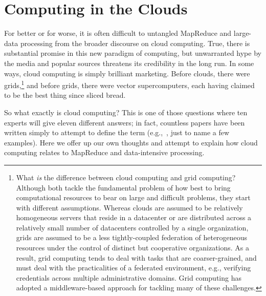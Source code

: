 \section{Computing in the Clouds}
\label{chapter1:clouds}

For better or for worse, it is often difficult to untangled MapReduce
and large-data processing from the broader discourse on cloud
computing.  True, there is substantial promise in this new paradigm of
computing, but unwarranted hype by the media and popular sources
threatens its credibility in the long run.  In some ways, cloud
computing is simply brilliant marketing.  Before clouds, there were
grids,\footnote{What {\it is} the difference between cloud computing
  and grid computing?  Although both tackle the fundamental problem of
  how best to bring computational resources to bear on large and
  difficult problems, they start with different assumptions.  Whereas
  clouds are assumed to be relatively homogeneous servers that reside
  in a datacenter or are distributed across a relatively small number
  of datacenters controlled by a single organization, grids are
  assumed to be a less tightly-coupled federation of heterogeneous
  resources under the control of distinct but cooperative
  organizations.  As a result, grid computing tends to deal with tasks
  that are coarser-grained, and must deal with the practicalities of a
  federated environment, e.g., verifying credentials across multiple
  administrative domains.  Grid computing has adopted a
  middleware-based approach for tackling many of these challenges.}
and before grids, there were vector supercomputers, each having
claimed to be the best thing since sliced bread.

So what exactly is cloud computing?  This is one of those questions
where ten experts will give eleven different answers; in fact,
countless papers have been written simply to attempt to define the
term
(e.g.,~\cite{Armbrust_etal_2009,Buyya_etal_2009,Vaquero_etal_2009},
just to name a few examples).  Here we offer up our own thoughts and
attempt to explain how cloud computing relates to MapReduce and
data-intensive processing.

